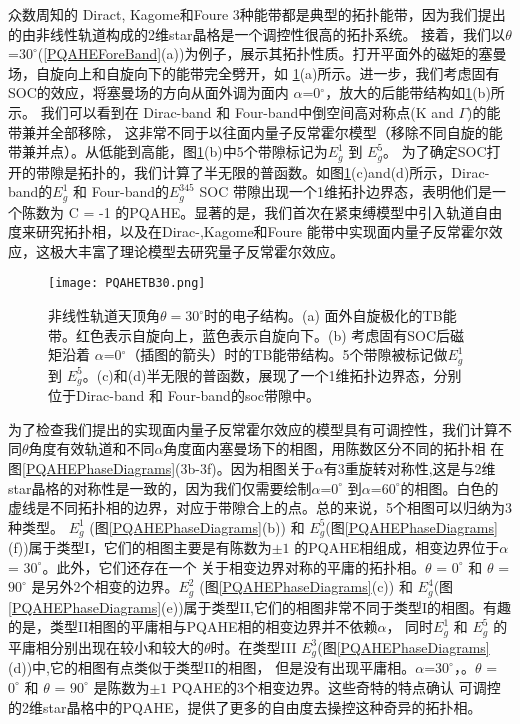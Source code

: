 众数周知的 Diract, Kagome和Foure 3种能带都是典型的拓扑能带\cite{PQAHE24,PQAHE25,PQAHE41}，因为我们提出的由非线性轨道构成的2维star晶格是一个调控性很高的拓扑系统。
接着，我们以$\theta$=$30^\circ$(\ref{PQAHEForeBand}(a))为例子，展示其拓扑性质。打开平面外的磁矩的塞曼场，自旋向上和自旋向下的能带完全劈开，如
\ref{PQAHETB30}(a)所示。进一步，我们考虑固有SOC的效应，将塞曼场的方向从面外调为面内 $\alpha$=0$^\circ$，放大的后能带结构如\ref{PQAHETB30}(b)所示。
我们可以看到在 Dirac-band 和 Four-band中倒空间高对称点(K and $\Gamma$)的能带兼并全部移除，
这非常不同于以往面内量子反常霍尔模型（移除不同自旋的能带兼并点）\cite{PQAHE18}。从低能到高能，图\ref{PQAHETB30}(b)中5个带隙标记为$E_g^1$ 到 $E_g^5$。
为了确定SOC打开的带隙是拓扑的，我们计算了半无限的普函数\cite{PQAHE23}。如图\ref{PQAHETB30}(c)and(d)所示，Dirac-band的$E_g^1$  和 Four-band的$E_g^{345}$ 
SOC 带隙出现一个1维拓扑边界态，表明他们是一个陈数为 C = -1 的PQAHE。显著的是，我们首次在紧束缚模型中引入轨道自由度来研究拓扑相，以及在Dirac-,Kagome和Foure
能带中实现面内量子反常霍尔效应，这极大丰富了理论模型去研究量子反常霍尔效应。
\begin{figure}[htb]
  \centering
  \texttt{[image: PQAHETB30.png]}
  \caption{非线性轨道天顶角$\theta=30^{\circ}$时的电子结构。(a) 面外自旋极化的TB能带。红色表示自旋向上，蓝色表示自旋向下。(b) 考虑固有SOC后磁矩沿着
  $\alpha$=0$^\circ$（插图的箭头）时的TB能带结构。5个带隙被标记做$E_g^1$ 到 $E_g^5$。(c)和(d)半无限的普函数，展现了一个1维拓扑边界态，分别位于Dirac-band 和
  Four-band的soc带隙中。} 
  \label{PQAHETB30}
  \note{}
\end{figure}


为了检查我们提出的实现面内量子反常霍尔效应的模型具有可调控性，我们计算不同$\theta$角度有效轨道和不同$\alpha$角度面内塞曼场下的相图，用陈数区分不同的拓扑相
在图\ref{PQAHEPhaseDiagrams}(3b-3f)。因为相图关于$\alpha$有3重旋转对称性,这是与2维star晶格的对称性是一致的，因为我们仅需要绘制$\alpha$=$0^\circ$ 
到$\alpha$=$60^\circ$的相图。白色的虚线是不同拓扑相的边界，对应于带隙合上的点。总的来说，5个相图可以归纳为3种类型。 $E_g^1$ (图\ref{PQAHEPhaseDiagrams}(b))
和 $E_g^5$(图\ref{PQAHEPhaseDiagrams}(f))属于类型I，它们的相图主要是有陈数为$\pm 1$ 的PQAHE相组成，相变边界位于$\alpha$ = $30^\circ$。此外，它们还存在一个
关于相变边界对称的平庸的拓扑相。$\theta$ = $0^\circ$ 和 $\theta$ = $90^\circ$ 是另外2个相变的边界。$E_g^2$ (图\ref{PQAHEPhaseDiagrams}(c))
和 $E_g^4$(图\ref{PQAHEPhaseDiagrams}(e))属于类型II,它们的相图非常不同于类型I的相图。有趣的是，类型II相图的平庸相与PQAHE相的相变边界并不依赖$\alpha$，
同时$E_g^1$ 和 $E_g^5$ 的平庸相分别出现在较小和较大的$\theta$时。在类型III $E_g^3$(图\ref{PQAHEPhaseDiagrams}(d))中,它的相图有点类似于类型II的相图，
但是没有出现平庸相。$\alpha$=$30^\circ$，。$\theta$ = $0^\circ$ 和 $\theta$ = $90^\circ$ 是陈数为$\pm 1$ PQAHE的3个相变边界。这些奇特的特点确认
可调控的2维star晶格中的PQAHE，提供了更多的自由度去操控这种奇异的拓扑相。

